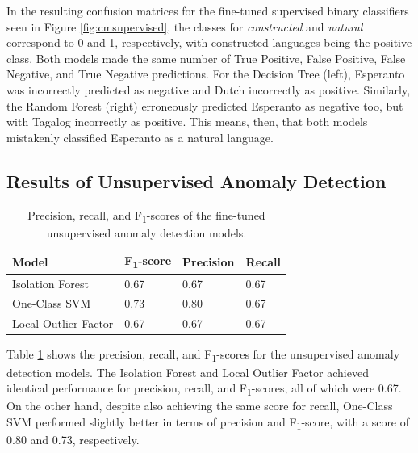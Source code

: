 \documentclass[12pt,a4paper]{article}
\numberwithin{figure}{section}
\numberwithin{table}{section}
\numberwithin{definition}{section}
\begin{document}
In the resulting confusion matrices for the fine-tuned supervised binary classifiers seen in Figure \ref{fig:cmsupervised}, the classes for \textit{constructed} and \textit{natural} correspond to 0 and 1, respectively, with constructed languages being the positive class. Both models made the same number of True Positive, False Positive, False Negative, and True Negative predictions. For the Decision Tree (left), Esperanto was incorrectly predicted as negative and Dutch incorrectly as positive. Similarly, the Random Forest (right) erroneously predicted Esperanto as negative too, but with Tagalog incorrectly as positive. This means, then, that both models mistakenly classified Esperanto as a natural language. 

\subsection{Results of Unsupervised Anomaly Detection}
\label{ssec:anomalydetectionresults}

\begin{table}[!h]
  \centering
  \caption{Precision, recall, and F\textsubscript{1}-scores of the fine-tuned unsupervised anomaly detection models.}
  \renewcommand{\arraystretch}{1.0}
  \begin{tabular}{|l|l|l|l|}
  \hline
    \textbf{Model} & \textbf{F\textsubscript{1}-score} & \textbf{Precision} & \textbf{Recall} \\ \hline
      Isolation Forest & 0.67 & 0.67 & 0.67 \\ 
      One-Class SVM & 0.73 & 0.80 & 0.67 \\
      Local Outlier Factor & 0.67 & 0.67 & 0.67 \\ \hline
  \end{tabular}
  \label{tbl:unsupervisedevaluation}
\end{table}

Table \ref{tbl:unsupervisedevaluation} shows the precision, recall, and F\textsubscript{1}-scores for the unsupervised anomaly detection models. The Isolation Forest and Local Outlier Factor achieved identical performance for precision, recall, and F\textsubscript{1}-scores, all of which were 0.67. On the other hand, despite also achieving the same score for recall, One-Class SVM performed slightly better in terms of precision and F\textsubscript{1}-score, with a score of 0.80 and 0.73, respectively.
\end{document}
